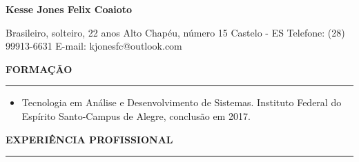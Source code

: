 \documentclass[a4paper,10pt]{article}
\begin{document}

\begin{flushleft}
    \begin{huge}
        \textbf{Kesse Jones Felix Coaioto}
    \end{huge}
\end{flushleft}

\begin{flushleft}
    Brasileiro, solteiro, 22 anos
    \newline
    Alto Chap\'{e}u, n\'{u}mero 15
    \newline
    Castelo - ES
    \newline
    Telefone: (28) 99913-6631
    \newline
    E-mail: kjonesfc@outlook.com\newline
\end{flushleft}

\begin{flushleft}
\textbf{FORMA\c{C}\~{A}O}
\noindent\textcolor{gray}{\rule{18cm}{1px}}
\end{flushleft}

\begin{flushleft}
\begin{itemize}
    \item Tecnologia em An\'{a}lise e Desenvolvimento de Sistemas. Instituto Federal do Esp\'{i}rito Santo-Campus de Alegre, conclus\~{a}o em 2017.
    \newline
\end{itemize}
\end{flushleft}

\begin{flushleft}
\textbf{EXPERI\^{E}NCIA PROFISSIONAL}
\noindent\textcolor{gray}{\rule{18cm}{1px}}
\end{flushleft}
\end{document}
